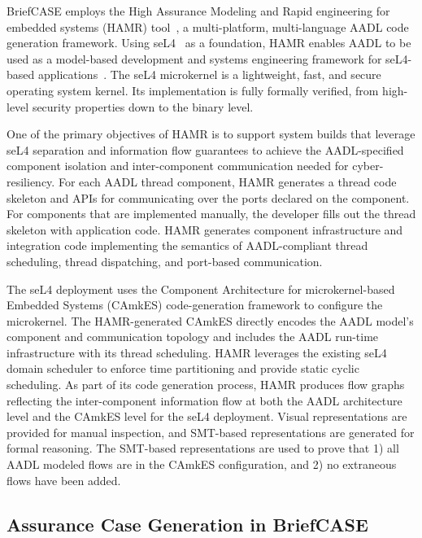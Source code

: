 BriefCASE employs the High Assurance Modeling and Rapid engineering for embedded systems (HAMR) tool~\cite{hamr}, a multi-platform, multi-language AADL code generation framework. 
Using seL4~\cite{sel4-sosp09} as a foundation, HAMR enables AADL to be used as a model-based development and systems engineering framework for seL4-based applications~\cite{hamr-sel4}. 
The seL4 microkernel is a lightweight, fast, and secure operating system kernel. Its implementation is fully formally verified, from high-level security properties down to the binary level.

One of the primary objectives of HAMR is to support system builds that leverage seL4 separation and information flow guarantees to achieve the AADL-specified component isolation and inter-component communication needed for cyber-resiliency. 
%
For each AADL thread component, HAMR generates a thread code skeleton and APIs for communicating over the ports declared on the component. For components that are implemented manually, the developer fills out the thread skeleton with application code. 
HAMR generates component infrastructure and integration code implementing the semantics of AADL-compliant thread scheduling, thread dispatching, and port-based communication. 

The seL4 deployment uses the Component Architecture for microkernel-based Embedded Systems (CAmkES) code-generation framework to configure the microkernel. The HAMR-generated CAmkES directly encodes the AADL model’s component and communication topology and includes the AADL run-time infrastructure with its thread scheduling. HAMR leverages the existing seL4 domain scheduler to enforce time partitioning and provide static cyclic scheduling. 
As part of its code generation process, HAMR produces flow graphs reflecting the inter-component information flow at both the AADL architecture level and the CAmkES level for the seL4 deployment. Visual representations are provided for manual inspection, and SMT-based representations are generated for formal reasoning. The SMT-based representations are used to prove that 1) all AADL modeled flows are in the CAmkES configuration, and 2) no extraneous flows have been added. 

\subsection{Assurance Case Generation in BriefCASE}
\label{sec:resolute}

